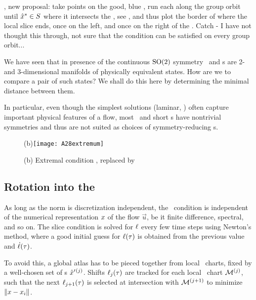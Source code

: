 , new proposal: take points on the good,
    blue \po, run each along the group orbit until $\hat{x}^\ast \in S$
    where it intersects the \sliceBord, see , and thus plot
    the border of where the local slice ends, once on the left, and once
    on the right of the {\template}. Catch - I have not thought this
    through, not sure that the condition  can be
    satisfied on every group orbit...

We have seen that in presence of the continuous $\textrm{SO}(2)$ symmetry
\reqva\ and \rpo s are 2- and 3-dimensional manifolds of physically
equivalent states. How are we to compare a pair of such states? We shall
do this here by determining the minimal distance between them.

In particular, even though the
simplest solutions (laminar, \etc) often capture important physical
features of a flow, most \eqva\ and short \po s have nontrivial
symmetries and thus are not suited as choices of symmetry-reducing
{\template s}.

\begin{figure}
   \centering
(b)\texttt{[image: A28extremum]}
   \caption{\label{fig:A28extremum1}
    (b) Extremal condition , replaced by
}
\end{figure}

\subsection{Rotation into the \slice}

As long as the norm is discretization independent, the \slice\ condition
 is independent of the numerical representation $x$ of
the flow $\vec{u}$, be it finite difference, spectral, and so on. The
slice condition is solved for $\ell$ every few time steps using
Newton's method, where a good initial guess for $\ell(\tau)$ is
obtained from the previous value and $\dot{\ell}(\tau)$.

To avoid this, a global
atlas has to be pieced together from local \slice\ charts, fixed by
a well-chosen set of
\template s ${\hat{x}'}{}^{(j)}$.
Shifts $\ell_j(\tau)$ are tracked for each local \slice\ chart ${\cal M}{}^{(j)}$,
such that the next $\ell_{j+1}(\tau)$ is selected at intersection with
${\cal M}{}^{(j+1)}$
to minimize $\|{{x}-{x_i}}\|$.

